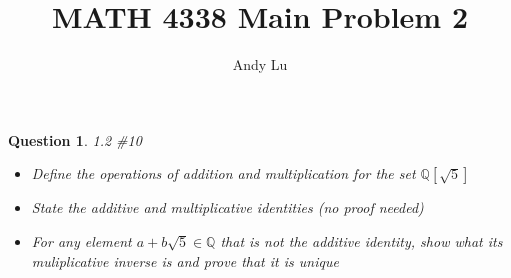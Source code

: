 \documentclass{article}
\title{MATH 4338 Main Problem 2}
\date{}
\author{Andy Lu}
\newtheorem{theorem*}{Question}
\begin{document}
  \maketitle
  \begin{theorem*} 1.2 \#10
    \newline
    \begin{itemize}
      \item Define the operations of addition and multiplication for the set $\mathbb{Q}[\sqrt{5}]$
      \item State the additive and multiplicative identities (no proof needed)
      \item For any element $a + b\sqrt{5} \in \mathbb{Q}$ that is not the additive identity, show
            what its muliplicative inverse is and prove that it is unique
    \end{itemize}
  \end{theorem*}
  
\end{document}
